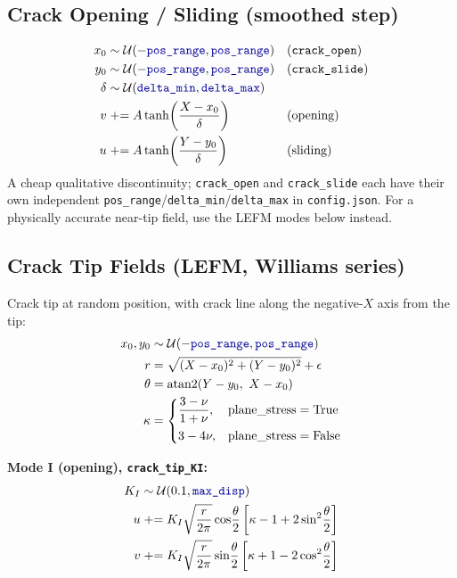 \documentclass[11pt]{article}
\newcommand{\param}[1]{\texttt{\color{blue!60!black}#1}}
\begin{document}
\subsection{Crack Opening / Sliding (smoothed step)}
\begin{align}
x_0 &\sim \mathcal{U}(-\param{pos\_range}, \param{pos\_range}) &&
\text{(\texttt{crack\_open})} \\
y_0 &\sim \mathcal{U}(-\param{pos\_range}, \param{pos\_range}) &&
\text{(\texttt{crack\_slide})} \\
\delta &\sim \mathcal{U}(\param{delta\_min}, \param{delta\_max}) \\
v &\mathrel{+}= A\tanh\!\left(\frac{X - x_0}{\delta}\right) && \text{(opening)} \\
u &\mathrel{+}= A\tanh\!\left(\frac{Y - y_0}{\delta}\right) && \text{(sliding)}
\end{align}
A cheap qualitative discontinuity; \texttt{crack\_open} and \texttt{crack\_slide}
each have their own independent \param{pos\_range}/\param{delta\_min}/\param{delta\_max}
in \texttt{config.json}. For a physically accurate near-tip field, use the
LEFM modes below instead.

\subsection{Crack Tip Fields (LEFM, Williams series)}
Crack tip at random position, with crack line along the negative-$X$ axis
from the tip:
\begin{align}
x_0, y_0 &\sim \mathcal{U}(-\param{pos\_range}, \param{pos\_range}) \\
r &= \sqrt{(X-x_0)^2 + (Y-y_0)^2} + \epsilon \\
\theta &= \operatorname{atan2}(Y - y_0,\ X - x_0) \\
\kappa &=
\begin{cases}
\dfrac{3-\nu}{1+\nu}, & \text{plane\_stress} = \text{True} \\[1.5ex]
3 - 4\nu, & \text{plane\_stress} = \text{False}
\end{cases}
\end{align}

\textbf{Mode I (opening), \texttt{crack\_tip\_KI}:}
\begin{align}
K_I &\sim \mathcal{U}(0.1, \param{max\_disp}) \\
u &\mathrel{+}= K_I \sqrt{\frac{r}{2\pi}} \cos\!\frac{\theta}{2}
\left[\kappa - 1 + 2\sin^2\!\frac{\theta}{2}\right] \\
v &\mathrel{+}= K_I \sqrt{\frac{r}{2\pi}} \sin\!\frac{\theta}{2}
\left[\kappa + 1 - 2\cos^2\!\frac{\theta}{2}\right]
\end{align}
\end{document}

